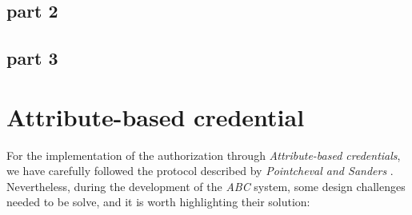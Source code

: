 \documentclass[10pt,conference,compsocconf]{IEEEtran}
\begin{document}
\subsection{part 2}
\subsection{part 3}
\section{Attribute-based credential}
For the implementation of the authorization through \textit{Attribute-based credentials}, we have carefully followed the protocol
described by \textit{Pointcheval and Sanders} \cite{PS_signature}.
Nevertheless, during the development of the \textit{ABC} system, some design challenges needed to be solve, and it is worth highlighting their solution:
\end{document}
